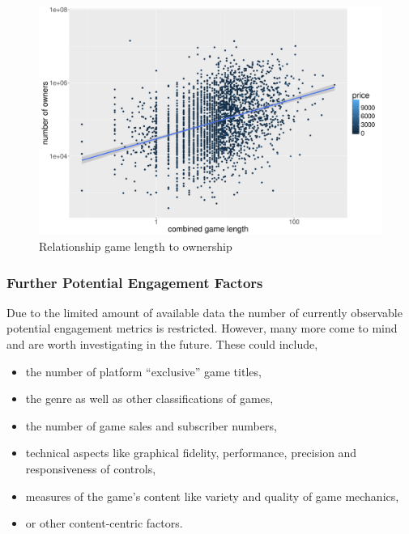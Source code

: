 \begin{figure}[!t]
	\centering
	\includegraphics[width=1.0\columnwidth]{images/rel-combinedlength-owners.pdf}
	\caption{Relationship game length to ownership}
\label{fig:rel-combinedlength-owners}
\end{figure}


\subsubsection{Further Potential Engagement Factors}

Due to the limited amount of available data the number of currently observable potential engagement metrics is restricted. However, many more come to mind and are worth investigating in the future. These could include,

\begin{itemize}
	\item the number of platform ``exclusive'' game titles,
	\item the genre as well as other classifications of games,
	\item the number of game sales and subscriber numbers,
	\item technical aspects like graphical fidelity, performance, precision and responsiveness of controls,
	\item measures of the game's content like variety and quality of game mechanics,
	\item or other content-centric factors.
\end{itemize}





